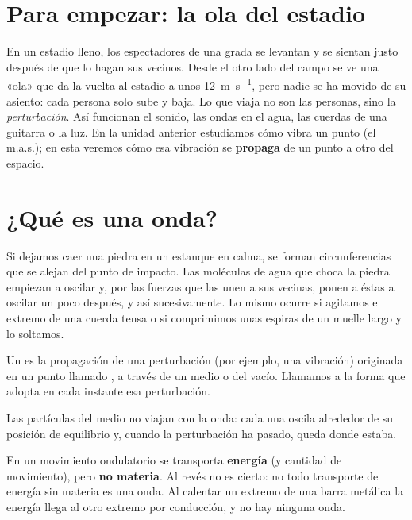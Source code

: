 
\section*{Para empezar: la ola del estadio}

En un estadio lleno, los espectadores de una grada se levantan y se sientan justo después de que lo hagan sus vecinos. Desde
el otro lado del campo se ve una «ola» que da la vuelta al estadio a unos \qty{12}{\m\per\second}, pero nadie se ha movido
de su asiento: cada persona solo sube y baja. Lo que viaja no son las personas, sino la \emph{perturbación}. Así funcionan
el sonido, las ondas en el agua, las cuerdas de una guitarra o la luz. En la unidad anterior estudiamos cómo vibra un punto
(el m.a.s.); en esta veremos cómo esa vibración se \textbf{propaga} de un punto a otro del espacio.

\section{¿Qué es una onda?}\label{sec:ond-concepto}

Si dejamos caer una piedra en un estanque en calma, se forman circunferencias que se alejan del punto de impacto. Las
moléculas de agua que choca la piedra empiezan a oscilar y, por las fuerzas que las unen a sus vecinas, ponen a éstas a
oscilar un poco después, y así sucesivamente. Lo mismo ocurre si agitamos el extremo de una cuerda tensa o si comprimimos
unas espiras de un muelle largo y lo soltamos.

\begin{definition}
    Un  es la propagación de una perturbación (por ejemplo, una vibración) originada en un
    punto llamado , a través de un medio o del vacío. Llamamos  a la forma que adopta en cada
    instante esa perturbación.
\end{definition}

Las partículas del medio no viajan con la onda: cada una oscila alrededor de su posición de equilibrio y, cuando la
perturbación ha pasado, queda donde estaba.

\begin{remark}
    En un movimiento ondulatorio se transporta \textbf{energía} (y cantidad de movimiento), pero \textbf{no materia}. Al
    revés no es cierto: no todo transporte de energía sin materia es una onda. Al calentar un extremo de una barra metálica
    la energía llega al otro extremo por conducción, y no hay ninguna onda.
\end{remark}

